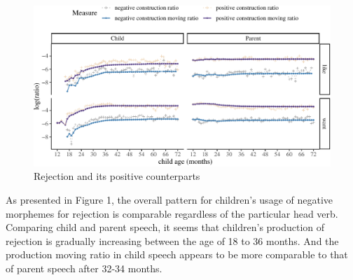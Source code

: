 \documentclass[
  english,
  man,floatsintext]{apa6}
\begin{document}
\begin{figure}[H]

{\centering \includegraphics{neg_construction_article_files/figure-latex/emotion-1} 

}

\caption{Rejection and its positive counterparts}\label{fig:emotion}
\end{figure}

As presented in Figure 1, the overall pattern for children's usage of negative morphemes for rejection is comparable regardless of the particular head verb. Comparing child and parent speech, it seems that children's production of rejection is gradually increasing between the age of 18 to 36 months. And the production moving ratio in child speech appears to be more comparable to that of parent speech after 32-34 months.
\end{document}
